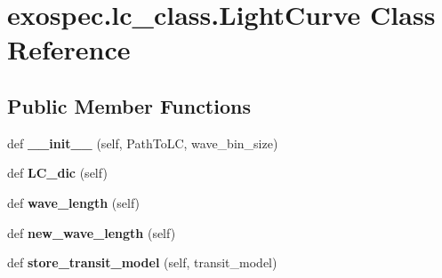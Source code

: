 \hypertarget{classexospec_1_1lc__class_1_1_light_curve}{}\section{exospec.\+lc\+\_\+class.\+Light\+Curve Class Reference}
\label{classexospec_1_1lc__class_1_1_light_curve}
\subsection*{Public Member Functions}
\begin{DoxyCompactItemize}
\item 
\mbox{\label{classexospec_1_1lc__class_1_1_light_curve_a231f0966a5321231cc9017956d7e037c}} 
def {\bfseries \+\_\+\+\_\+init\+\_\+\+\_\+} (self, Path\+To\+LC, wave\+\_\+bin\+\_\+size)
\item 
\mbox{\label{classexospec_1_1lc__class_1_1_light_curve_aa0feb2d525e844a5f010939b3a8e9ae9}} 
def {\bfseries L\+C\+\_\+dic} (self)
\item 
\mbox{\label{classexospec_1_1lc__class_1_1_light_curve_a9da0e4bf8f9ea153afb534d63fb7d24a}} 
def {\bfseries wave\+\_\+length} (self)
\item 
\mbox{\label{classexospec_1_1lc__class_1_1_light_curve_a8af62f3180b7d965c9d02ad92b1f0089}} 
def {\bfseries new\+\_\+wave\+\_\+length} (self)
\item 
\mbox{\label{classexospec_1_1lc__class_1_1_light_curve_aa71fe5f0926727ae236782c414a08a4b}} 
def {\bfseries store\+\_\+transit\+\_\+model} (self, transit\+\_\+model)
\end{DoxyCompactItemize}
